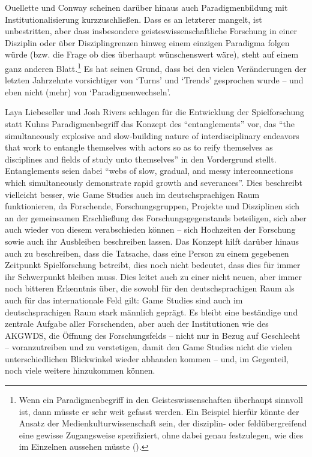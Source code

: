 \documentclass{scrartcl}
\begin{document}
Ouellette und Conway scheinen darüber hinaus auch Paradigmenbildung mit Institutionalisierung kurzzuschließen.
Dass es an letzterer mangelt, ist unbestritten, aber dass insbesondere geisteswissenschaftliche Forschung in einer Disziplin oder über Disziplingrenzen hinweg einem einzigen Paradigma folgen würde (bzw. die Frage ob dies überhaupt wünschenswert wäre), steht auf einem ganz anderen Blatt.\footnote{Wenn ein Paradigmenbegriff in den Geisteswissenschaften überhaupt sinnvoll ist, dann müsste er sehr weit gefasst werden. Ein Beispiel hierfür könnte der Ansatz der Medienkulturwissenschaft sein, der disziplin- oder feldübergreifend eine gewisse Zugangsweise spezifiziert, ohne dabei genau festzulegen, wie dies im Einzelnen aussehen müsste (\autocite[vgl.][S.~228]{unterhuber_parents_2025}).}
Es hat seinen Grund, dass bei den vielen Veränderungen der letzten Jahrzehnte vorsichtiger von \enquote*{Turns} und \enquote*{Trends} gesprochen wurde -- und eben nicht (mehr) von \enquote*{Paradigmenwechseln}.

Laya Liebeseller und Josh Rivers schlagen für die Entwicklung der Spielforschung statt Kuhns Paradigmenbegriff das Konzept des \enquote{entanglements} vor, das \enquote{the simultaneously explosive and slow-building nature of interdisciplinary endeavors that work to entangle themselves with actors so as to reify themselves as disciplines and fields of study unto themselves} in den Vordergrund stellt.\autocite[][S.~422]{liebeseller_anthropology_2025}
Entanglements seien dabei \enquote{webs of slow, gradual, and messy interconnections which simultaneously demonstrate rapid growth and severances}.\autocite[][S.~422]{liebeseller_anthropology_2025}
Dies beschreibt vielleicht besser, wie Game Studies auch im deutschsprachigen Raum funktionieren, da Forschende, Forschungsgruppen, Projekte und Disziplinen sich an der gemeinsamen Erschließung des Forschungsgegenstands beteiligen, sich aber auch wieder von diesem verabschieden können -- sich Hochzeiten der Forschung sowie auch ihr Ausbleiben beschreiben lassen.
Das Konzept hilft darüber hinaus auch zu beschreiben, dass die Tatsache, dass eine Person zu einem gegebenen Zeitpunkt Spielforschung betreibt, dies noch nicht bedeutet, dass dies für immer ihr Schwerpunkt bleiben muss.
Dies leitet auch zu einer nicht neuen, aber immer noch bitteren Erkenntnis über, die sowohl für den deutschsprachigen Raum als auch für das internationale Feld gilt:
Game Studies sind auch im deutschsprachigen Raum stark männlich geprägt.
Es bleibt eine beständige und zentrale Aufgabe aller Forschenden, aber auch der Institutionen wie des AKGWDS, die Öffnung des Forschungsfelds -- nicht nur in Bezug auf Geschlecht -- voranzutreiben und zu verstetigen, damit den Game Studies nicht die vielen unterschiedlichen Blickwinkel wieder abhanden kommen -- und, im Gegenteil, noch viele weitere hinzukommen können.
\end{document}
